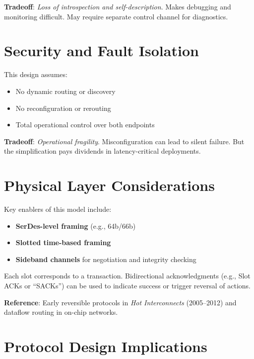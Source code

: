 \documentclass[HFT-main.tex]{subfiles} %
\begin{document}
\textbf{Tradeoff}: \emph{Loss of introspection and self-description}. Makes debugging and monitoring difficult. May require separate control channel for diagnostics.

\section{Security and Fault Isolation}

This design assumes:
\begin{itemize}
  \item No dynamic routing or discovery
  \item No reconfiguration or rerouting
  \item Total operational control over both endpoints
\end{itemize}


\textbf{Tradeoff}: \emph{Operational fragility}. Misconfiguration can lead to silent failure. But the simplification pays dividends in latency-critical deployments.

\section{Physical Layer Considerations}

Key enablers of this model include:
\begin{itemize}
  \item \textbf{SerDes-level framing} (e.g., 64b/66b)
  \item \textbf{Slotted time-based framing}
  \item \textbf{Sideband channels} for negotiation and integrity checking
\end{itemize}


Each slot corresponds to a transaction. Bidirectional acknowledgments (e.g., Slot ACKs or ``SACKs'') can be used to indicate success or trigger reversal of actions.

\textbf{Reference}: Early reversible protocols in \textit{Hot Interconnects} (2005–2012) and dataflow routing in on-chip networks.

\section{Protocol Design Implications}
\end{document}
